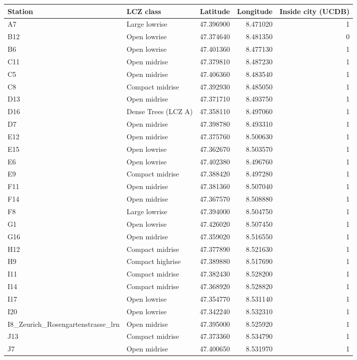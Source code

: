 \begin{tabular}{llrrr}
\toprule
Station & LCZ class & Latitude & Longitude & Inside city (UCDB) \\
\midrule
A7 & Large lowrise & 47.396900 & 8.471020 & 1 \\
B12 & Open lowrise & 47.374640 & 8.481350 & 0 \\
B6 & Open lowrise & 47.401360 & 8.477130 & 1 \\
C11 & Open midrise & 47.379810 & 8.487230 & 1 \\
C5 & Open midrise & 47.406360 & 8.483540 & 1 \\
C8 & Compact midrise & 47.392930 & 8.485050 & 1 \\
D13 & Open midrise & 47.371710 & 8.493750 & 1 \\
D16 & Dense Trees (LCZ A) & 47.358110 & 8.497060 & 1 \\
D7 & Open midrise & 47.398780 & 8.493310 & 1 \\
E12 & Open midrise & 47.375760 & 8.500630 & 1 \\
E15 & Open lowrise & 47.362670 & 8.503570 & 1 \\
E6 & Open lowrise & 47.402380 & 8.496760 & 1 \\
E9 & Compact midrise & 47.388420 & 8.497280 & 1 \\
F11 & Open midrise & 47.381360 & 8.507040 & 1 \\
F14 & Open midrise & 47.367570 & 8.508880 & 1 \\
F8 & Large lowrise & 47.394000 & 8.504750 & 1 \\
G1 & Open lowrise & 47.426020 & 8.507450 & 1 \\
G16 & Open midrise & 47.359020 & 8.516550 & 1 \\
H12 & Compact midrise & 47.377890 & 8.521630 & 1 \\
H9 & Compact highrise & 47.389880 & 8.517690 & 1 \\
I11 & Compact midrise & 47.382430 & 8.528200 & 1 \\
I14 & Compact midrise & 47.368920 & 8.528820 & 1 \\
I17 & Open lowrise & 47.354770 & 8.531140 & 1 \\
I20 & Open lowrise & 47.342240 & 8.532310 & 1 \\
I8_Zeurich_Rosengartenstrasse_lrn & Open midrise & 47.395000 & 8.525920 & 1 \\
J13 & Compact midrise & 47.373360 & 8.534790 & 1 \\
J7 & Open midrise & 47.400650 & 8.531970 & 1 \\

\end{tabular}
